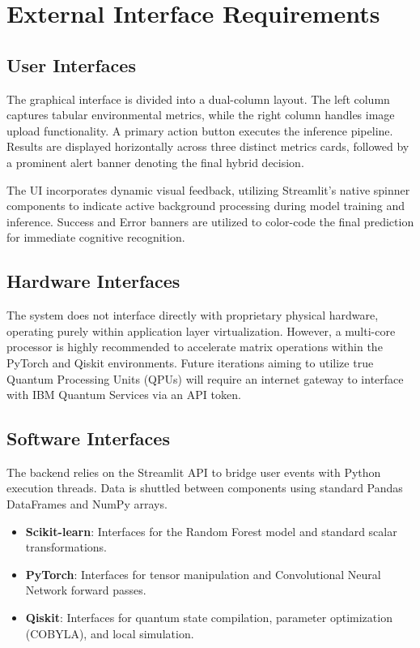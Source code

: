 \documentclass[conference]{IEEEtran}
\begin{document}
\section{External Interface Requirements}
\subsection{User Interfaces}
The graphical interface is divided into a dual-column layout. The left column captures tabular environmental metrics, while the right column handles image upload functionality. A primary action button executes the inference pipeline. Results are displayed horizontally across three distinct metrics cards, followed by a prominent alert banner denoting the final hybrid decision.

The UI incorporates dynamic visual feedback, utilizing Streamlit's native spinner components to indicate active background processing during model training and inference. Success and Error banners are utilized to color-code the final prediction for immediate cognitive recognition.

\subsection{Hardware Interfaces}
The system does not interface directly with proprietary physical hardware, operating purely within application layer virtualization. However, a multi-core processor is highly recommended to accelerate matrix operations within the PyTorch and Qiskit environments. Future iterations aiming to utilize true Quantum Processing Units (QPUs) will require an internet gateway to interface with IBM Quantum Services via an API token.

\subsection{Software Interfaces}
The backend relies on the Streamlit API to bridge user events with Python execution threads. Data is shuttled between components using standard Pandas DataFrames and NumPy arrays.
\begin{itemize}
    \item \textbf{Scikit-learn}: Interfaces for the Random Forest model and standard scalar transformations.
    \item \textbf{PyTorch}: Interfaces for tensor manipulation and Convolutional Neural Network forward passes.
    \item \textbf{Qiskit}: Interfaces for quantum state compilation, parameter optimization (COBYLA), and local simulation.
\end{itemize}
\end{document}
